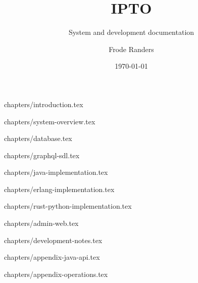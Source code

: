 \documentclass{techdoc}
\date{\today}
\title{IPTO}
\subtitle{System and development documentation}
\author{Frode Randers}
\begin{document}
    \rhead{}

    \maketitle

    \vfill

    \newpage
    \renewcommand\contentsname{Contents}
    \tableofcontents
    \newpage


     {chapters/introduction.tex}
    \newpage

     {chapters/system-overview.tex}
    \newpage

     {chapters/database.tex}
    \newpage

     {chapters/graphql-sdl.tex}
    \newpage

     {chapters/java-implementation.tex}
    \newpage

     {chapters/erlang-implementation.tex}
    \newpage

     {chapters/rust-python-implementation.tex}
    \newpage

     {chapters/admin-web.tex}
    \newpage

     {chapters/development-notes.tex}
    \newpage

     {chapters/appendix-java-api.tex}
    \newpage

     {chapters/appendix-operations.tex}
    \newpage
\end{document}
